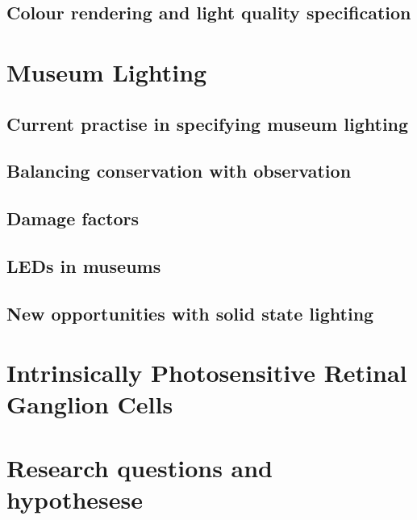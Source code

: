 \subsection{Colour rendering and light quality specification}

\section{Museum Lighting}
\subsection{Current practise in specifying museum lighting}
\subsection{Balancing conservation with observation}
\subsection{Damage factors}
\subsection{LEDs in museums}
\subsection{New opportunities with solid state lighting}


\section{Intrinsically Photosensitive Retinal Ganglion Cells}
\section{Research questions and hypothesese}
